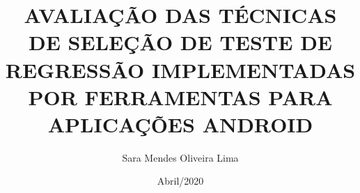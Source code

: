 \documentclass[pt, qual, classic, oneside, a4paper, scr]{ufba/ufbathesis}
\institute{Instituto de Matem\'{a}tica e Estatística}
\title{AVALIAÇÃO DAS TÉCNICAS DE SELEÇÃO DE TESTE DE REGRESSÃO IMPLEMENTADAS POR FERRAMENTAS PARA APLICAÇÕES ANDROID}
\date{Abril/2020}
\author{Sara Mendes Oliveira Lima}
\begin{document}
\pgcompfrontpage
\frontmatter

\pgcomppresentationpage



\tableofcontents
\listoffigures
\listoftables



\mainmatter








\backmatter





\end{document}
